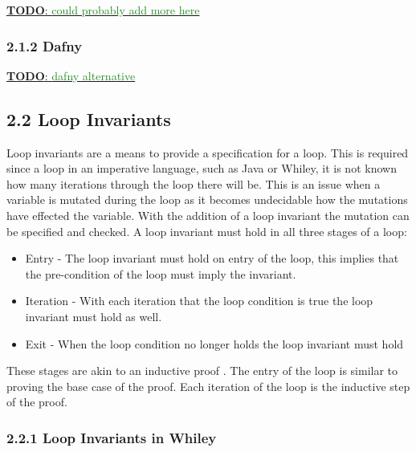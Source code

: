 \documentclass[11pt, a4paper, twoside, openright]{report}
\newcommand{\todo}[1]{\huge{\underline{\textbf{\textcolor{RubineRed}{TODO}}: \textcolor{ForestGreen}{#1}}}\normalsize }
\begin{document}
\todo{could probably add more here}

\cite{whiley-design}
\cite{whiley-arrays}

\subsubsection*{2.1.2 Dafny}
\todo{dafny alternative}
\cite{dafny-started}
\cite{dafny-lang}


\subsection*{2.2 Loop Invariants}
%

Loop invariants are a means to provide a specification for a loop.
This is required since a loop in an imperative language, such as Java or
Whiley, it is not known how many iterations through the loop there will be.
This is an issue when a variable is mutated during the loop as it becomes
undecidable how the mutations have effected the variable.
With the addition of a loop invariant the mutation can be specified and
checked.
A loop invariant must hold in all three stages of a loop:

\begin{itemize}
\item Entry - The loop invariant must hold on entry of the loop,
    this implies that the pre-condition of the loop must imply the invariant.
\item Iteration - With each iteration that the loop condition is true the
    loop invariant must hold as well.
\item Exit - When the loop condition no longer holds the loop
    invariant must hold
\end{itemize}

These stages are akin to an inductive proof \cite{invarints-classifiction}.
The entry of the loop is similar to proving the base case of the proof.
Each iteration of the loop is the inductive step of the proof. 

\subsubsection*{2.2.1 Loop Invariants in Whiley}
\end{document}
